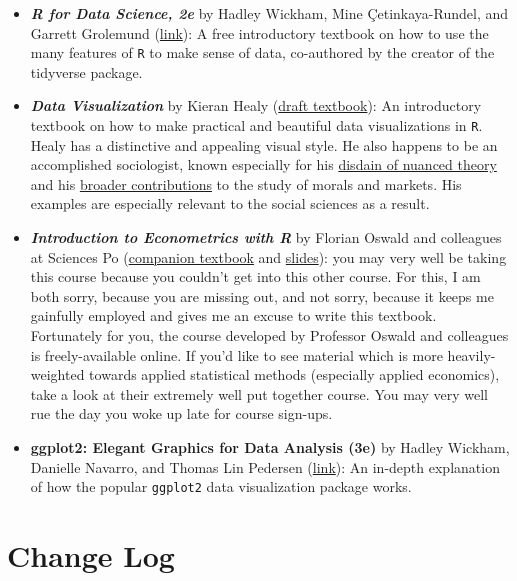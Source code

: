 \documentclass[
  letterpaper,
]{book}
\providecommand{\tightlist}{%
  \setlength{\itemsep}{0pt}\setlength{\parskip}{0pt}}\usepackage{longtable,booktabs,array}
\begin{document}
\begin{itemize}
\tightlist
\item
  \textbf{\emph{R for Data Science, 2e}} by Hadley Wickham, Mine
  Çetinkaya-Rundel, and Garrett Grolemund
  (\href{https://r4ds.hadley.nz/}{link}): A free introductory textbook
  on how to use the many features of \texttt{R} to make sense of data,
  co-authored by the creator of the tidyverse package.
\item
  \textbf{\emph{Data Visualization}} by Kieran Healy
  (\href{https://socviz.co/}{draft textbook}): An introductory textbook
  on how to make practical and beautiful data visualizations in
  \texttt{R}. Healy has a distinctive and appealing visual style. He
  also happens to be an accomplished sociologist, known especially for
  his
  \href{https://kieranhealy.org/files/papers/fuck-nuance.pdf}{disdain of
  nuanced theory} and his
  \href{https://kieranhealy.org/publications/}{broader contributions} to
  the study of morals and markets. His examples are especially relevant
  to the social sciences as a result.
\item
  \textbf{\emph{Introduction to Econometrics with R}} by Florian Oswald
  and colleagues at Sciences Po
  (\href{https://scpoecon.github.io/ScPoEconometrics/index.html}{companion
  textbook} and
  \href{https://github.com/ScPoEcon/ScPoEconometrics-Slides}{slides}):
  you may very well be taking this course because you couldn't get into
  this other course. For this, I am both sorry, because you are missing
  out, and not sorry, because it keeps me gainfully employed and gives
  me an excuse to write this textbook. Fortunately for you, the course
  developed by Professor Oswald and colleagues is freely-available
  online. If you'd like to see material which is more heavily-weighted
  towards applied statistical methods (especially applied economics),
  take a look at their extremely well put together course. You may very
  well rue the day you woke up late for course sign-ups.
\item
  \textbf{ggplot2: Elegant Graphics for Data Analysis (3e)} by Hadley
  Wickham, Danielle Navarro, and Thomas Lin Pedersen
  (\href{https://ggplot2-book.org/}{link}): An in-depth explanation of
  how the popular \texttt{ggplot2} data visualization package works.
\end{itemize}

\hypertarget{change-log}{%
\section*{Change Log}\label{change-log}}
\end{document}
